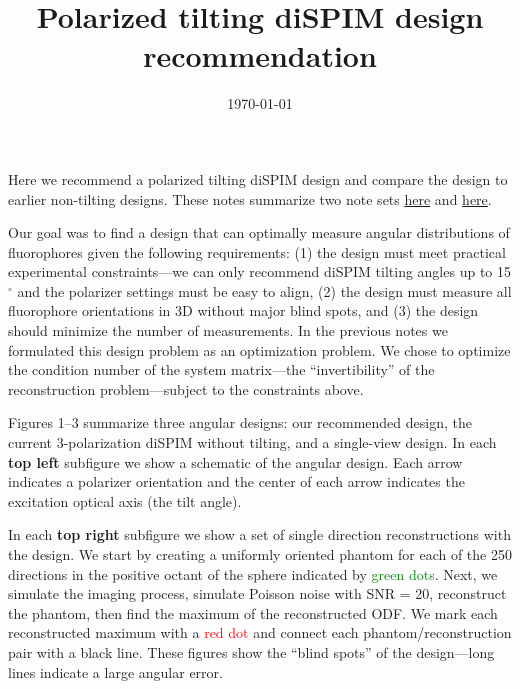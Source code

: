 \documentclass[11pt]{article}
\begin{document}
\title{\vspace{-2.5em} Polarized tilting diSPIM design recommendation\vspace{-1em}} %
\date{\vspace{-3em}\today\vspace{-1em}}
\maketitle

Here we recommend a polarized tilting diSPIM design and compare the design to
earlier non-tilting designs. These notes summarize two note sets
\href{https://github.com/talonchandler/polharmonic/blob/master/notes/2018-12-10-angular-svd/report/report.pdf}{here}
and
\href{https://github.com/talonchandler/polharmonic/blob/master/notes/2019-01-28-angular-optimize/report/report.pdf}{here}.

Our goal was to find a design that can optimally measure angular distributions
of fluorophores given the following requirements: (1) the design must meet
practical experimental constraints---we can only recommend diSPIM tilting angles
up to 15${}^{\circ}$ and the polarizer settings must be easy to align, (2) the
design must measure all fluorophore orientations in 3D without major blind spots, and
(3) the design should minimize the number of measurements. In the previous notes
we formulated this design problem as an optimization problem. We chose to
optimize the condition number of the system matrix---the ``invertibility'' of
the reconstruction problem---subject to the constraints above.

Figures 1--3 summarize three angular designs: our recommended design, the
current 3-polarization diSPIM without tilting, and a single-view design. In each
\textbf{top left} subfigure we show a schematic of the angular design. Each
arrow indicates a polarizer orientation and the center of each arrow indicates
the excitation optical axis (the tilt angle).

In each \textbf{top right} subfigure we show a set of single direction
reconstructions with the design. We start by creating a uniformly oriented
phantom for each of the 250 directions in the positive octant of the sphere
indicated by \textcolor{green}{green dots}. Next, we simulate the imaging
process, simulate Poisson noise with SNR = 20, reconstruct the phantom, then
find the maximum of the reconstructed ODF. We mark each reconstructed maximum with a
\textcolor{red}{red dot} and connect each phantom/reconstruction pair with a
black line. These figures show the ``blind spots'' of the design---long lines
indicate a large angular error.
\end{document}
